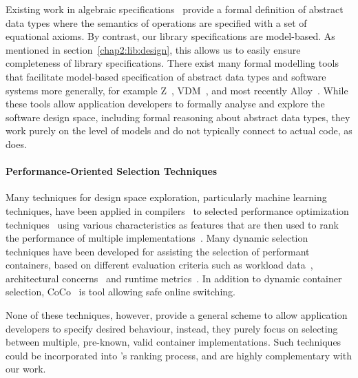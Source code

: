 Existing work in algebraic specifications~\citep{10.1145/800237.807124, WIRSING1990675} provide a formal definition of abstract data types where the semantics of operations are specified with a set of equational axioms.
By contrast, our library specifications are model-based. As mentioned in section~\ref{chap2:lib:design}, this allows us to easily ensure completeness of library specifications.
There exist many formal modelling tools that facilitate model-based specification of abstract data types and software systems more generally, for example Z~\citep{znotation}, VDM~\citep{vdm}, and most recently Alloy~\citep{alloy}. While these tools allow 
application developers to formally analyse and explore the software design space, including formal reasoning about abstract data types, they work purely on the level of models and do not typically connect
to actual code, as \Primrose{} does. 

\paragraph*{Performance-Oriented Selection Techniques}
Many techniques for design space exploration, particularly machine learning techniques, have been applied in compilers~\citep{fursin2011milepost} to selected performance optimization techniques~\citep{10.1109/CGO.2007.32} using various characteristics as features that are then used to rank the performance of multiple implementations~\citep{DBLP:conf/icse/SiegmundKKABRS12}.
Many dynamic selection techniques have been developed for assisting the selection of performant containers, based on different evaluation criteria such as workload data~\citep{DBLP:conf/cgo/CostaA18}, architectural concerns~\citep{DBLP:conf/pldi/JungRRCP11} and runtime metrics~\citep{DBLP:conf/pldi/ShachamVY09}. In addition to dynamic container selection, CoCo~\citep{DBLP:conf/ecoop/Xu13} is tool allowing safe online switching.

None of these techniques, however, provide a general scheme to allow application developers to specify desired behaviour, instead, they purely focus on selecting between multiple, pre-known, valid container implementations. Such techniques could be incorporated into \Primrose{}'s ranking process, and are highly complementary with our work.

